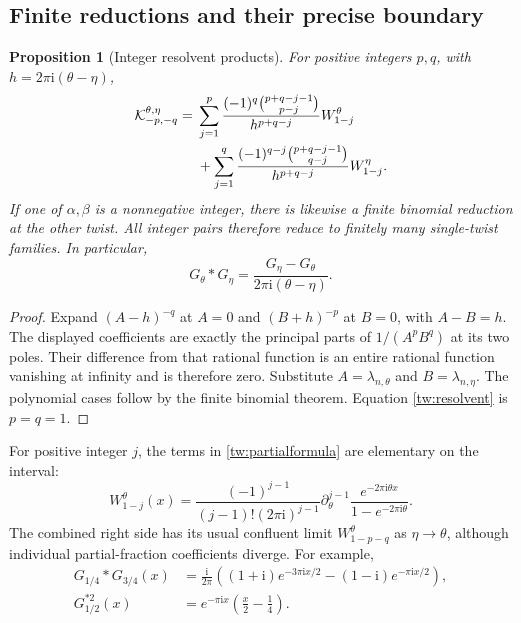 \documentclass[11pt,a4paper]{article}
\numberwithin{equation}{section}
\newtheorem{proposition}[theorem]{Proposition}
\theoremstyle{definition}
\theoremstyle{remark}
\newcommand{\ii}{\mathrm i}
\begin{document}
\subsection{Finite reductions and their precise boundary}

\begin{proposition}[Integer resolvent products]
\label{tw:partial}
For positive integers $p,q$, with $h=2\pi\ii(\theta-\eta)$,
\begin{align}
 \mathcal K_{-p,-q}^{\theta,\eta}
 ={}&\sum_{j=1}^p
  \frac{(-1)^q\binom{p+q-j-1}{p-j}}{h^{p+q-j}}
                  W_{1-j}^\theta\notag\\
 &+\sum_{j=1}^q
  \frac{(-1)^{q-j}\binom{p+q-j-1}{q-j}}{h^{p+q-j}}
                  W_{1-j}^\eta.
 \label{tw:partialformula}
\end{align}
If one of $\alpha,\beta$ is a nonnegative integer, there is likewise
a finite binomial reduction at the other twist. All integer pairs
therefore reduce to finitely many single-twist families. In particular,
\begin{equation}
 G_\theta*G_\eta=\frac{G_\eta-G_\theta}{2\pi\ii(\theta-\eta)}.
 \label{tw:resolvent}
\end{equation}
\end{proposition}

\begin{proof}
Expand $(A-h)^{-q}$ at $A=0$ and $(B+h)^{-p}$ at $B=0$, with
$A-B=h$. The displayed coefficients are exactly the principal parts
of $1/(A^pB^q)$ at its two poles. Their difference from that rational
function is an entire rational function vanishing at infinity and is
therefore zero. Substitute $A=\lambda_{n,\theta}$ and
$B=\lambda_{n,\eta}$. The polynomial cases follow by the finite
binomial theorem. Equation \eqref{tw:resolvent} is $p=q=1$.
\end{proof}

For positive integer $j$, the terms in \eqref{tw:partialformula}
are elementary on the interval:
\begin{equation}
 W_{1-j}^\theta(x)
  =\frac{(-1)^{j-1}}{(j-1)!(2\pi\ii)^{j-1}}
      \partial_\theta^{j-1}
      \frac{e^{-2\pi\ii\theta x}}{1-e^{-2\pi\ii\theta}}.
 \label{tw:elementary}
\end{equation}
The combined right side has its usual confluent limit
$W_{1-p-q}^{\theta}$ as $\eta\to\theta$, although individual
partial-fraction coefficients diverge. For example,
\begin{align}
 G_{1/4}*G_{3/4}(x)
  &=\frac{\ii}{2\pi}
    \left((1+\ii)e^{-3\pi\ii x/2}
                   -(1-\ii)e^{-\pi\ii x/2}\right),\label{tw:quarters}\\
 G_{1/2}^{*2}(x)&=e^{-\pi\ii x}
                         \left(\frac{x}{2}-\frac14\right).
 \label{tw:half}
\end{align}
\end{document}
